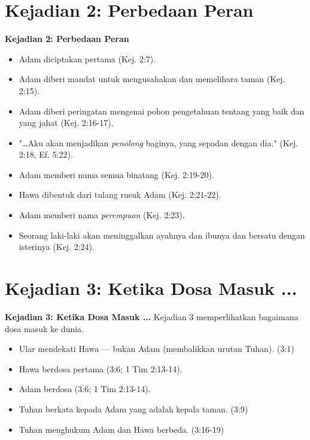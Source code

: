 \documentclass{beamer}
\theoremstyle{mystyle}
\begin{document}
\section{Kejadian 2: Perbedaan Peran}
\begin{frame}{\textbf{Kejadian 2: Perbedaan Peran}}
	\begin{itemize}
		\item<2-> Adam diciptakan pertama (Kej. 2:7).		
		\item<3-> Adam diberi mandat untuk mengusahakan dan memelihara taman (Kej. 2:15).
		\item<4-> Adam diberi peringatan mengenai pohon pengetahuan tentang yang baik dan yang jahat (Kej. 2:16-17).
		\item<5-> "\ldots Aku akan menjadikan \textit{penolong} baginya, yang sepadan dengan dia." (Kej. 2:18, Ef. 5:22).
		\item<6-> Adam memberi nama semua binatang (Kej. 2:19-20).
		\item<7-> Hawa dibentuk dari tulang rusuk Adam (Kej. 2:21-22).
		\item<8-> Adam memberi nama \textit{perempuan} (Kej. 2:23).
		\item<9-> Seorang laki-laki akan meninggalkan ayahnya dan ibunya dan bersatu dengan isterinya (Kej. 2:24).
	\end{itemize}
\end{frame}

\section{Kejadian 3: Ketika Dosa Masuk ...}
\begin{frame}{\textbf{Kejadian 3: Ketika Dosa Masuk ...}}
	Kejadian 3 memperlihatkan bagaimana dosa masuk ke dunia.
	\begin{itemize}
		\item<2-> Ular mendekati Hawa --- bukan Adam (membalikkan urutan Tuhan). (3:1)
		\item<3-> Hawa berdosa pertama (3:6; 1 Tim 2:13-14). 
		\item<4-> Adam berdosa (3:6; 1 Tim 2:13-14). 
		\item<5-> Tuhan berkata kepada Adam yang adalah kepala taman. (3:9)
		\item<6-> Tuhan menghukum Adam dan Hawa berbeda. (3:16-19)
	\end{itemize}
	

	\bigskip

\end{frame}
\end{document}
